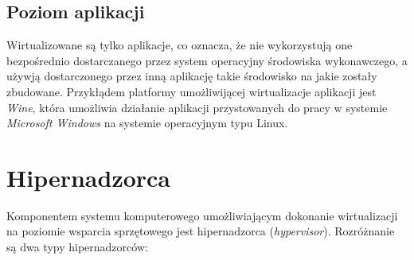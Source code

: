\documentclass[polish, a4paper, 12pt, oneside]{book}
\begin{document}
\subsection {Poziom aplikacji}
Wirtualizowane są tylko aplikacje, co oznacza, że nie wykorzystują one bezpośrednio dostarczanego przez system operacyjny środowiska wykonawczego, a używją dostarczonego przez inną aplikację takie środowisko na jakie zostały zbudowane. Przykłądem platformy umożliwijącej wirtualizacje aplikacji jest \textit{Wine}\cite{wine}, która umożliwia działanie aplikacji przystowanych do pracy w systemie \textit{Microsoft Windows}\cite{windows} na systemie operacyjnym typu Linux.
 
\section{Hipernadzorca}
Komponentem systemu komputerowego umożliwiającym dokonanie wirtualizacji na poziomie wsparcia sprzętowego jest hipernadzorca (\textit{hypervisor}). Rozróżnanie są dwa typy hipernadzorców:
\end{document}
